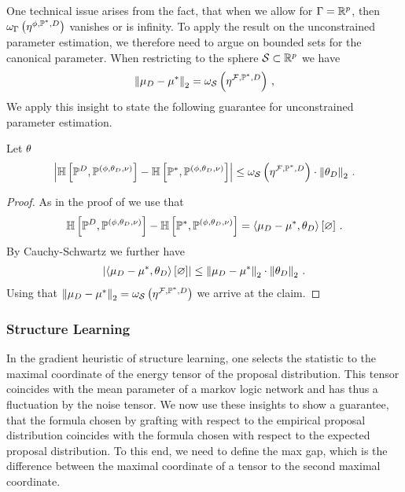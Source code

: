 One technical issue arises from the fact, that when we allow for $\Gamma=\mathbb{R}^{p}$, then $\omega_{\Gamma}\left(\eta^{\phi,\mathbb{P}^*,D}\right)$ vanishes or is infinity.
To apply the result on the unconstrained parameter estimation, we therefore need to argue on bounded sets for the canonical parameter.
When restricting to the sphere $\mathcal{S}\subset\mathbb{R}^{p}$ we have
\begin{align*}
    \left\|\mu_{D}-\mu^*\right\|_{2} = \omega_{\mathcal{S}}\left(\eta^{\mathcal{F},\mathbb{P}^*,D}\right) \, ,
\end{align*}
We apply this insight to state the following guarantee for unconstrained parameter estimation.
\begin{theorem}
    \label{the:detGuaranteeUnconstrained}
    Let $\theta$
    \begin{align*}
        \left|\mathbb{H}\left[\mathbb{P}^{D},\mathbb{P}^{(\phi,\theta_{D},\nu)}\right]-\mathbb{H}\left[\mathbb{P}^*,\mathbb{P}^{(\phi,\theta_{D},\nu)}\right]\right|
        \leq \omega_{\mathcal{S}}\left(\eta^{\mathcal{F},\mathbb{P}^*,D}\right) \cdot \left\|\theta_{D}\right\|_{2} \, .
    \end{align*}
\end{theorem}
\begin{proof}
    As in the proof of  we use that
    \begin{align*}
        \mathbb{H}\left[\mathbb{P}^{D},\mathbb{P}^{(\phi,\theta_{D},\nu)}\right]-\mathbb{H}\left[\mathbb{P}^*,\mathbb{P}^{(\phi,\theta_{D},\nu)}\right]
        = \left\langle \mu_{D}-\mu^*,\theta_{D}\right\rangle \left[ \varnothing \right]  \, .
    \end{align*}
    By Cauchy-Schwartz we further have
    \begin{align*}
        \left|\left\langle \mu_{D}-\mu^*,\theta_{D}\right\rangle \left[ \varnothing \right]\right| \leq \left\|\mu_{D}-\mu^*\right\|_{2}\cdot\left\|\theta_{D}\right\|_{2} \, .
    \end{align*}
    Using that $\left\|\mu_{D}-\mu^*\right\|_{2}=\omega_{\mathcal{S}}\left(\eta^{\mathcal{F},\mathbb{P}^*,D}\right)$ we arrive at the claim.
\end{proof}

\subsubsection{Structure Learning}

In the gradient heuristic of structure learning, one selects the statistic to the maximal coordinate of the energy tensor of the proposal distribution.
This tensor coincides with the mean parameter of a markov logic network and has thus a fluctuation by the noise tensor.
We now use these insights to show a guarantee, that the formula chosen by grafting with respect to the empirical proposal distribution coincides with the formula chosen with respect to the expected proposal distribution.
To this end, we need to define the max gap, which is the difference between the maximal coordinate of a tensor to the second maximal coordinate.

